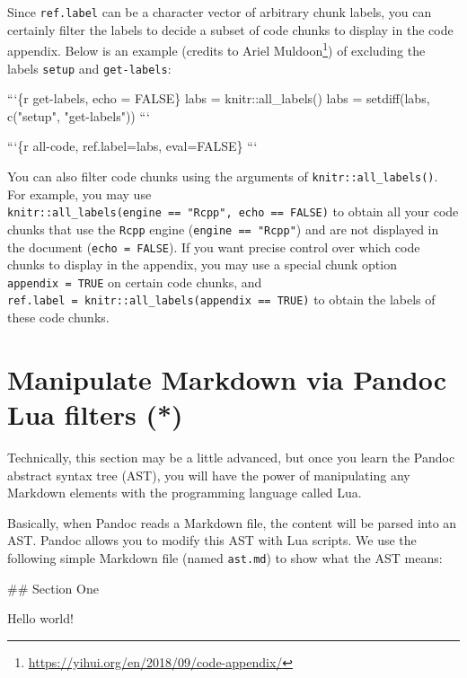 \documentclass[
  11pt,
]{krantz}
\newenvironment{Shaded}{\begin{snugshade}}{\end{snugshade}}
\newcommand{\BaseNTok}[1]{\textcolor[rgb]{0.06,0.06,0.06}{#1}}
\newcommand{\FunctionTok}[1]{\textcolor[rgb]{0,0,0}{#1}}
\newcommand{\NormalTok}[1]{#1}
\renewcommand{\href}[2]{#2\footnote{\url{#1}}}
\begin{document}
Since \texttt{ref.label} can be a character vector of arbitrary chunk labels, you can certainly filter the labels to decide a subset of code chunks to display in the code appendix. Below is an example (credits to \href{https://yihui.org/en/2018/09/code-appendix/}{Ariel Muldoon}) of excluding the labels \texttt{setup} and \texttt{get-labels}:

\begin{Shaded}
\begin{Highlighting}[]
\BaseNTok{```\{r get-labels, echo = FALSE\}}
\BaseNTok{labs = knitr::all_labels()}
\BaseNTok{labs = setdiff(labs, c("setup", "get-labels"))}
\BaseNTok{```}

\BaseNTok{```\{r all-code, ref.label=labs, eval=FALSE\}}
\BaseNTok{```}
\end{Highlighting}
\end{Shaded}

You can also filter code chunks using the arguments of \texttt{knitr::all\_labels()}. For example, you may use \texttt{knitr::all\_labels(engine\ ==\ "Rcpp",\ echo\ ==\ FALSE)} to obtain all your code chunks that use the \texttt{Rcpp} engine (\texttt{engine\ ==\ "Rcpp"}) and are not displayed in the document (\texttt{echo\ =\ FALSE}). If you want precise control over which code chunks to display in the appendix, you may use a special chunk option \texttt{appendix\ =\ TRUE} on certain code chunks, and \texttt{ref.label\ =\ knitr::all\_labels(appendix\ ==\ TRUE)} to obtain the labels of these code chunks.

\hypertarget{lua-filters}{%
\section{Manipulate Markdown via Pandoc Lua filters (*)}\label{lua-filters}}

Technically, this section may be a little advanced, but once you learn the Pandoc abstract syntax tree (AST), you will have the power of manipulating any Markdown elements with the programming language called Lua.

Basically, when Pandoc reads a Markdown file, the content will be parsed into an AST. Pandoc allows you to modify this AST with Lua scripts. We use the following simple Markdown file (named \texttt{ast.md}) to show what the AST means:

\begin{Shaded}
\begin{Highlighting}[]
\FunctionTok{## Section One}

\NormalTok{Hello world!}
\end{Highlighting}
\end{Shaded}
\end{document}
